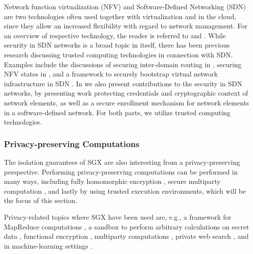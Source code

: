 Network function virtualization (NFV) and Software-Defined Networking (SDN) are two technologies often used together with virtualization and in the cloud, since they allow an increased flexibility with regard to network management.
For an overview of respective technology, the reader is referred to \cite{casado:2014} and \cite{mijumbi:2016}. %
While security in SDN networks is a broad topic in itself, there has been previous research discussing trusted computing technologies in connection with SDN.
Examples include the discussions of securing inter-domain routing in \cite{kim:2015}, securing NFV states in \cite{shih:2016}, and a framework to securely bootstrap virtual network infrastructure in SDN \cite{paladi:2016b}.
In  we also present contributions to the security in SDN networks, by presenting work protecting credentials and cryptographic context of network elements, as well as a secure enrollment mechanism for network elements in a software-defined network.
For both parts, we utilize trusted computing technologies.

\subsubsection{Privacy-preserving Computations}

The isolation guarantees of SGX are also interesting from a privacy-preserving perspective.
Performing privacy-preserving computations can be performed in many ways, including fully homomorphic encryption \cite{gentry:2009}, secure multiparty computation \cite{yao:1982}, and lastly by using trusted execution environments, which will be the focus of this section.

Privacy-related topics where SGX have been used are, e.g., a framework for MapReduce computations \cite{schuster:2015}, a sandbox to perform arbitrary calculations on secret data \cite{hunt:2018}, functional encryption \cite{fisch:2017}, multiparty computations \cite{kucuk:2016,bahmani:2017}, private web search \cite{mokhtar:2017,pires:2018}, and in machine-learning settings \cite{ohrimenko:2016,chandra:2017,hunt:2018b}.

